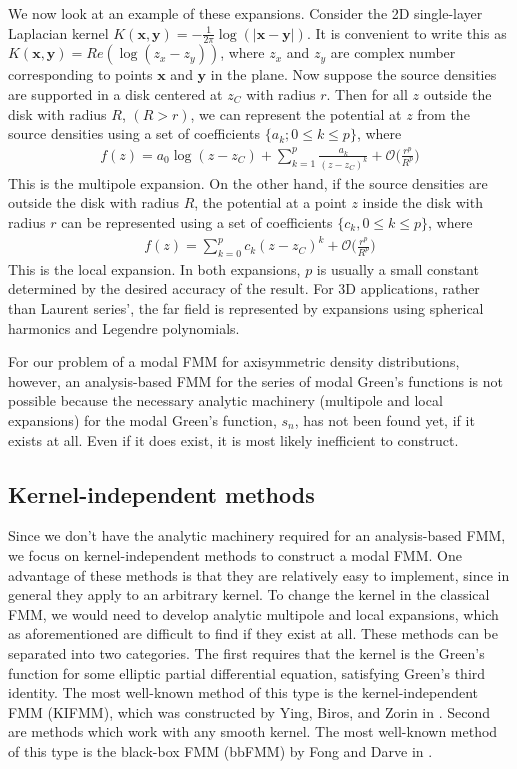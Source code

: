 \documentclass[11pt, oneside]{article}   	%
\begin{document}
We now look at an example of these expansions. Consider the 2D single-layer Laplacian kernel $K(\mathbf{x},\mathbf{y})=-\frac{1}{2\pi}\log(|\mathbf{x}-\mathbf{y}|)$. It is convenient to write this as $K(\mathbf{x},\mathbf{y})=Re(\log(z_x-z_y))$, where $z_x$ and $z_y$ are complex number corresponding to points $\mathbf{x}$ and $\mathbf{y}$ in the plane. Now suppose the source densities are supported in a disk centered at $z_C$ with radius $r$. Then for all $z$ outside the disk with radius $R$, $(R > r)$, we can represent the potential at $z$ from the source densities using a set of coefficients $\{a_k ; 0 \le k \le p\}$, where
\begin{align}
f(z)=a_0\log(z-z_C)+\sum_{k=1}^p\frac{a_k}{(z-z_C)^k}+\mathcal{O}\bigg(\frac{r^p}{R^p}\bigg)
\end{align}
This is the multipole expansion. On the other hand, if the source densities are outside the disk with radius $R$, the potential at a point $z$ inside the disk with radius $r$ can be represented using a set of coefficients $\{c_k, 0\le k\le p\}$, where
\begin{align}
f(z)=\sum_{k=0}^pc_k(z-z_C)^k+\mathcal{O}\bigg(\frac{r^p}{R^p}\bigg)
\end{align}
This is the local expansion. In both expansions, $p$ is usually a small constant determined by the desired accuracy of the result. For 3D applications, rather than Laurent series', the far field is represented by expansions using spherical harmonics and Legendre polynomials.

For our problem of a modal FMM for axisymmetric density distributions, however, an analysis-based FMM for the series of modal Green's functions is not possible because the necessary analytic machinery (multipole and local expansions) for the modal Green's function, $s_n$, has not been found yet, if it exists at all. Even if it does exist, it is most likely inefficient to construct.

\subsection{Kernel-independent methods}
Since we don't have the analytic machinery required for an analysis-based FMM, we focus on kernel-independent methods to construct a modal FMM. One advantage of these methods is that they are relatively easy to implement, since in general they apply to an arbitrary kernel. To change the kernel in the classical FMM, we would need to develop analytic multipole and local expansions, which as aforementioned are difficult to find if they exist at all. These methods can be separated into two categories. The first requires that the kernel is the Green's function for some elliptic partial differential equation, satisfying Green's third identity. The most well-known method of this type is the kernel-independent FMM (KIFMM), which was constructed by Ying, Biros, and Zorin in \cite{YBZ}. Second are methods which work with any smooth kernel. The most well-known method of this type is the black-box FMM (bbFMM) by Fong and Darve in \cite{FD}.
\end{document}
